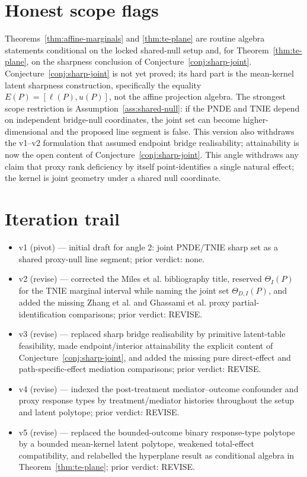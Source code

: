 \documentclass[11pt]{article}
\theoremstyle{definition}
\theoremstyle{plain}
\theoremstyle{remark}
\begin{document}
\section{Honest scope flags}
Theorems~\ref{thm:affine-marginals} and \ref{thm:te-plane} are routine algebra
statements conditional on the locked shared-null setup and, for
Theorem~\ref{thm:te-plane}, on the sharpness conclusion of
Conjecture~\ref{conj:sharp-joint}.  Conjecture~\ref{conj:sharp-joint} is not
yet proved; its hard part is the mean-kernel latent sharpness construction,
specifically the equality
\(E(P)=[\ell(P),u(P)]\), not the affine projection algebra.  The strongest
scope restriction is Assumption~\ref{ass:shared-null}: if the PNDE and TNIE
depend on independent bridge-null coordinates, the joint set can become
higher-dimensional and the proposed line segment is false.  This version also
withdraws the v1--v2 formulation that assumed endpoint bridge realisability;
attainability is now the open content of Conjecture~\ref{conj:sharp-joint}.
This angle withdraws any claim that proxy rank deficiency by itself
point-identifies a single natural effect; the kernel is joint geometry under a
shared null coordinate.

\section{Iteration trail}
\begin{itemize}[leftmargin=*]
\item v1 (pivot) --- initial draft for angle 2: joint PNDE/TNIE sharp set as
a shared proxy-null line segment; prior verdict: none.
\item v2 (revise) --- corrected the Miles et al. bibliography title, reserved
\(\Theta_I(P)\) for the TNIE marginal interval while naming the joint set
\(\Theta_{D,I}(P)\), and added the missing Zhang et al. and Ghassami et al.
proxy partial-identification comparisons; prior verdict: REVISE.
\item v3 (revise) --- replaced sharp bridge realisability by primitive
latent-table feasibility, made endpoint/interior attainability the explicit
content of Conjecture~\ref{conj:sharp-joint}, and added the missing pure
direct-effect and path-specific-effect mediation comparisons; prior verdict:
REVISE.
\item v4 (revise) --- indexed the post-treatment mediator--outcome confounder
and proxy response types by treatment/mediator histories throughout the setup
and latent polytope; prior verdict: REVISE.
\item v5 (revise) --- replaced the bounded-outcome binary response-type
polytope by a bounded mean-kernel latent polytope, weakened total-effect
compatibility, and relabelled the hyperplane result as conditional algebra in
Theorem~\ref{thm:te-plane};
prior verdict: REVISE.
\end{itemize}
\end{document}
